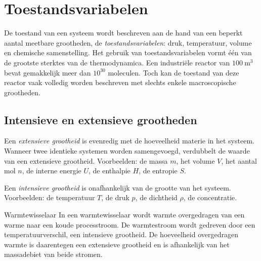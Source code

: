 
\section{Toestandsvariabelen}

De toestand van een systeem wordt beschreven aan de hand van een beperkt aantal meetbare grootheden, de \emph{toestandsvariabelen}: druk, temperatuur, volume en chemische samenstelling. Het gebruik van toestandsvariabelen vormt \'e\'en van de grootste sterktes van de thermodynamica. Een industri\"ele reactor van $100~\mathrm{m^3}$ bevat gemakkelijk meer dan $10^{30}$ moleculen. Toch kan de toestand van deze reactor vaak volledig worden beschreven met slechts enkele macroscopische grootheden.

\subsection{Intensieve en extensieve grootheden}

Een \emph{extensieve grootheid} is evenredig met de hoeveelheid materie in het systeem. Wanneer twee identieke systemen worden samengevoegd, verdubbelt de waarde van een extensieve grootheid. Voorbeelden: de massa $m$, het volume $V$, het aantal mol $n$, de interne energie $U$, de enthalpie $H$, de entropie $S$.

Een \emph{intensieve grootheid} is onafhankelijk van de grootte van het systeem. Voorbeelden: de temperatuur $T$, de druk $p$, de dichtheid $\rho$, de concentratie.

\begin{toepassing}{Warmtewisselaar}
In een warmtewisselaar wordt warmte overgedragen van een warme naar een koude processtroom. De warmtestroom wordt gedreven door een temperatuurverschil, een intensieve grootheid. De hoeveelheid overgedragen warmte is daarentegen een extensieve grootheid en is afhankelijk van het massadebiet van beide stromen.
\end{toepassing}

